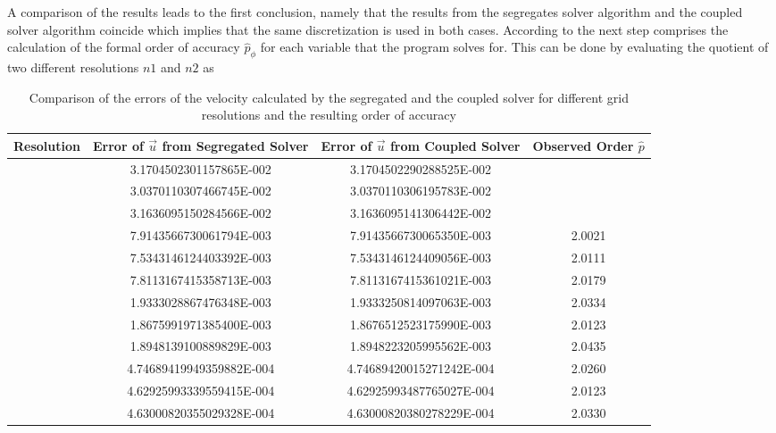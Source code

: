 A comparison of the results leads to the first conclusion, namely that the results from the segregates solver algorithm and the coupled solver algorithm coincide which implies that the same discretization is used in both cases. According to \cite{salari00} the next step comprises the calculation of the formal order of accuracy \(\hat{p}_\phi\) for each variable that the program solves for. This can be done by evaluating the quotient of two different resolutions \(n1\) and \(n2\) as 

\begin{table}[h!]\centering
{}
  \begin{tabular}{cccc}\toprule
    Resolution & Error of \(\vec{u}\) from Segregated Solver & Error of \(\vec{u}\) from Coupled Solver & Observed Order \(\hat{p}\) \\
    \midrule
    \rowcolor{black!20}\multirow{3}{*}{}          & 3.1704502301157865E-002 & 3.1704502290288525E-002 &  \\
    \rowcolor{black!20}                           & 3.0370110307466745E-002 & 3.0370110306195783E-002 &  \\
    \rowcolor{black!20} \multirow{-3}{*}{8x8x8}   & 3.1636095150284566E-002 & 3.1636095141306442E-002 &  \\ %
    \rowcolor{black!00}\multirow{3}{*}{}          & 7.9143566730061794E-003 &  7.9143566730065350E-003 & 2.0021  \\
    \rowcolor{black!00}                           & 7.5343146124403392E-003 &  7.5343146124409056E-003 & 2.0111  \\
    \rowcolor{black!00} \multirow{-3}{*}{16x16x16}& 7.8113167415358713E-003 &  7.8113167415361021E-003 & 2.0179  \\ %
    \rowcolor{black!20}\multirow{3}{*}{}          & 1.9333028867476348E-003  & 1.9333250814097063E-003 & 2.0334  \\
    \rowcolor{black!20}                           & 1.8675991971385400E-003  & 1.8676512523175990E-003 & 2.0123  \\
    \rowcolor{black!20} \multirow{-3}{*}{32x32x32}&  1.8948139100889829E-003 & 1.8948223205995562E-003 & 2.0435  \\ %
    \rowcolor{black!00}\multirow{3}{*}{}          & 4.74689419949359882E-004 & 4.74689420015271242E-004 & 2.0260 \\
    \rowcolor{black!00}                           & 4.62925993339559415E-004 & 4.62925993487765027E-004 & 2.0123 \\
    \rowcolor{black!00} \multirow{-3}{*}{64x64x64}& 4.63000820355029328E-004 & 4.63000820380278229E-004 & 2.0330 \\ %
  \end{tabular}
  \caption{Comparison of the errors of the velocity calculated by the segregated and the coupled solver for different grid resolutions and the resulting order of accuracy}
\end{table}

